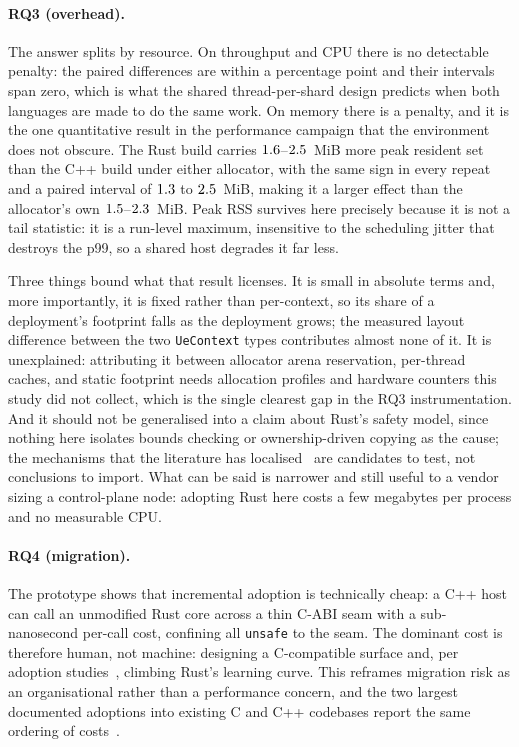 \documentclass[english,twoside,openright,a4paper,censored,csm,software-track-2020]{HYthesisML}
\begin{document}
\paragraph{RQ3 (overhead).} The answer splits by resource. On throughput and CPU there is no
detectable penalty: the paired differences are within a percentage point and their intervals
span zero, which is what the shared thread-per-shard design predicts when both languages are
made to do the same work. On memory there is a penalty, and it is the one quantitative result
in the performance campaign that the environment does not obscure. The Rust build carries
$1.6$--$2.5$~MiB more peak resident set than the C++ build under either
allocator, with the same sign in every repeat and a paired interval of $1.3$ to
$2.5$~MiB, making it a larger effect than the allocator's own
$1.5$--$2.3$~MiB. Peak RSS survives here precisely because it is not a
tail statistic: it is a run-level maximum, insensitive to the scheduling jitter that destroys
the p99, so a shared host degrades it far less.

Three things bound what that result licenses. It is small in absolute terms and, more
importantly, it is fixed rather than per-context, so its share of a deployment's footprint
falls as the deployment grows; the measured layout difference between the two
\texttt{UeContext} types contributes almost none of it. It is unexplained: attributing it
between allocator arena reservation, per-thread caches, and static footprint needs allocation
profiles and hardware counters this study did not collect, which is the single clearest gap in
the RQ3 instrumentation. And it should not be generalised into a claim about Rust's safety
model, since nothing here isolates bounds checking or ownership-driven copying as the cause;
the mechanisms that the literature has localised~\cite{zhang2022runtime,harris2023morello}
are candidates to test, not conclusions to import. What can be said is narrower and still
useful to a vendor sizing a control-plane node: adopting Rust here costs a few megabytes per
process and no measurable CPU.

\paragraph{RQ4 (migration).} The prototype shows that incremental adoption is technically
cheap: a C++ host can call an unmodified Rust core across a thin C-ABI seam with a
sub-nanosecond per-call cost, confining all \texttt{unsafe} to the seam. The dominant cost is
therefore human, not machine: designing a C-compatible surface and, per adoption
studies~\cite{fulton2021adopting,crichton2024learning}, climbing Rust's learning curve. This
reframes migration risk as an organisational rather than a performance concern, and the two
largest documented adoptions into existing C and C++ codebases report the same ordering of
costs~\cite{li2024rustforlinux,fan2026android}.
\end{document}

